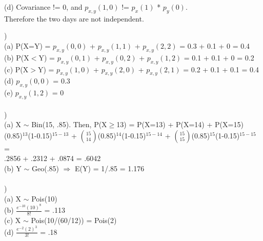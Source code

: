 \documentclass[12pt]{article}
\begin{document}
\indent (d) Covariance != 0, and $p_{x, y}(1, 0)$ != $p_{x}(1)$ * $p_{y}(0)$. \\
\indent \indent Therefore the two days are not independent.\\


\noindent \hrulefill 


)\\
\indent (a) P(X=Y) = $p_{x, y}(0, 0)$ + $p_{x, y}(1, 1)$ + $p_{x, y}(2, 2)$ = 0.3 + 0.1 + 0 = 0.4\\

\indent (b) P(X$<$Y) = $p_{x, y}(0, 1)$ + $p_{x, y}(0, 2)$ + $p_{x, y}(1, 2)$ = 0.1 + 0.1 + 0 = 0.2\\

\indent (c) P(X$>$Y) = $p_{x, y}(1, 0)$ + $p_{x, y}(2, 0)$ + $p_{x, y}(2, 1)$ = 0.2 + 0.1 + 0.1 = 0.4\\

\indent (d) $p_{x, y}(0, 0)$ = 0.3\\

\indent (e) $p_{x, y}(1, 2)$ = 0\\


\noindent \hrulefill \\


)\\
\indent (a) X $\sim$ Bin(15, .85). Then, P(X$\ge$13) = P(X=13) + P(X=14) + P(X=15)\\[.4em]
\indent {}(0.85)$^{13}$(1-0.15)$^{15-13}$ + {\Large$\binom{15}{14}$}(0.85)$^{14}$(1-0.15)$^{15-14}$ + {\Large$\binom{15}{15}$}(0.85)$^{15}$(1-0.15)$^{15-15}$ = \\[.5em]
\indent \indent .2856 + .2312 + .0874 = .6042\\

\indent (b) Y $\sim$ Geo(.85) $\Rightarrow$ E(Y) = 1/.85 = 1.176\\


\noindent \hrulefill \\


)\\
\indent (a) X $\sim$ Pois(10)\\

\indent (b) {\Large $\frac{e^{-10}(10)^8}{8!}$} = .113\\

\indent (c) X $\sim$ Pois(10/(60/12)) = Pois(2)\\

\indent (d) {\Large $\frac{e^{-2}(2)^3}{3!}$} = .18\\
\end{document}
